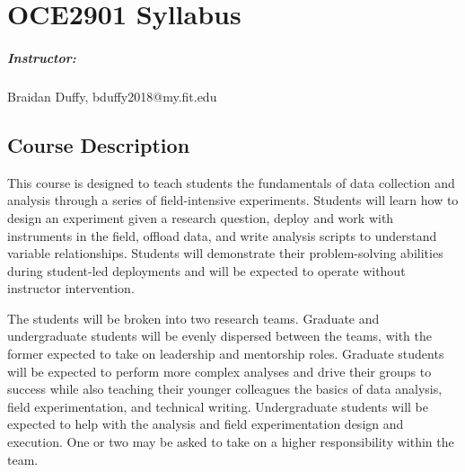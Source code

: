 \documentclass[
	letterpaper, %
	fontsize=10pt, %
	twoside=true, %
	numbers=noenddot, %
]{kaobook}
\begin{document}






\chapter*{OCE2901 Syllabus}

\paragraph*{Instructor:} Braidan Duffy, bduffy2018@my.fit.edu

\section*{Course Description} 
This course is designed to teach students the fundamentals of data collection and analysis through a series of field-intensive experiments.
Students will learn how to design an experiment given a research question, deploy and work with instruments in the field, offload data, and write analysis scripts to understand variable relationships.
Students will demonstrate their problem-solving abilities during student-led deployments and will be expected to operate without instructor intervention.

The students will be broken into two research teams.
Graduate and undergraduate students will be evenly dispersed between the teams, with the former expected to take on leadership and mentorship roles.
Graduate students will be expected to perform more complex analyses and drive their groups to success while also teaching their younger colleagues the basics of data analysis, field experimentation, and technical writing.
Undergraduate students will be expected to help with the analysis and field experimentation design and execution. One or two may be asked to take on a higher responsibility within the team. 
\end{document}
